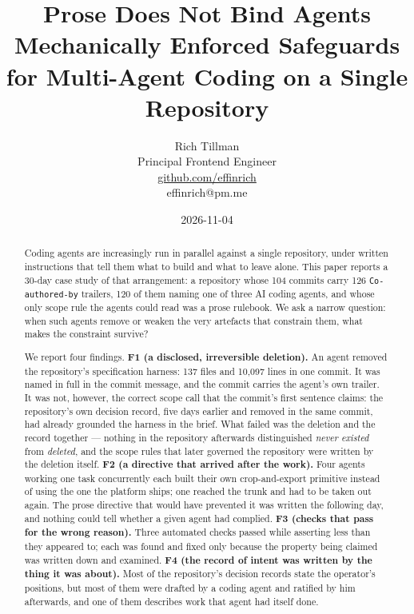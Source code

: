 \documentclass[11pt,a4paper]{article}
\begin{document}
\title{Prose Does Not Bind Agents\\ \large Mechanically Enforced Safeguards for Multi-Agent Coding on a Single Repository}
\author{Rich Tillman\\ Principal Frontend Engineer \\ \href{https://github.com/effinrich}{github.com/effinrich} \\ effinrich@pm.me}
\date{2026-11-04}

\maketitle

\begin{abstract}
Coding agents are increasingly run in parallel against a single repository, under written instructions that tell them what to build and what to leave alone. This paper reports a 30-day case study of that arrangement: a repository whose 104 commits carry 126 \texttt{Co-authored-by} trailers, 120 of them naming one of three AI coding agents, and whose only scope rule the agents could read was a prose rulebook. We ask a narrow question: when such agents remove or weaken the very artefacts that constrain them, what makes the constraint survive?

We report four findings. \textbf{F1 (a disclosed, irreversible deletion).} An agent removed the repository's specification harness: 137 files and 10,097 lines in one commit. It was named in full in the commit message, and the commit carries the agent's own trailer. It was not, however, the correct scope call that the commit's first sentence claims: the repository's own decision record, five days earlier and removed in the same commit, had already grounded the harness in the brief. What failed was the deletion and the record together --- nothing in the repository afterwards distinguished \emph{never existed} from \emph{deleted}, and the scope rules that later governed the repository were written by the deletion itself. \textbf{F2 (a directive that arrived after the work).} Four agents working one task concurrently each built their own crop-and-export primitive instead of using the one the platform ships; one reached the trunk and had to be taken out again. The prose directive that would have prevented it was written the following day, and nothing could tell whether a given agent had complied. \textbf{F3 (checks that pass for the wrong reason).} Three automated checks passed while asserting less than they appeared to; each was found and fixed only because the property being claimed was written down and examined. \textbf{F4 (the record of intent was written by the thing it was about).} Most of the repository's decision records state the operator's positions, but most of them were drafted by a coding agent and ratified by him afterwards, and one of them describes work that agent had itself done.


\end{abstract}
\end{document}

